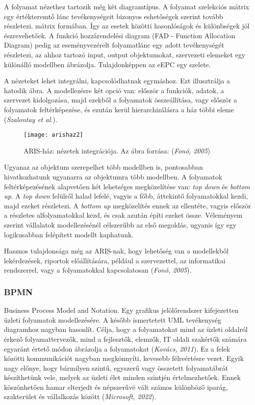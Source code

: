 \documentclass[12pt]{article}
\begin{document}
A folyamat nézethez tartozik még két diagramtípus. A folyamat szelekciós mátrix egy értékteremtő lánc tevékenységeit bizonyos eshetőségek szerint tovább részletezi, mátrix formában. Így az esetek közötti hasonlóságok és különbségek jól észrevehetőek. A funkció hozzárendelési diagram (FAD -  Function Allocation Diagram) pedig az eseményvezérelt folyamatlánc egy adott tevékenységét részletezi, az ahhoz tartozó input, output objektumokat, szervezeti elemeket egy különálló modellben ábrázolja. Tulajdonképpen az eEPC egy szelete.

A nézeteket lehet integrálni, kapcsolódhatnak egymáshoz. Ezt illusztrálja a hatodik ábra. A modellezésre két opció van: először a funkciók, adatok, a szervezet kidolgozása, majd ezekből a folyamatok összeállítása, vagy először a folyamatok feltérképezése, és ezután kerül hierarchizálásra a ház többi eleme (\textit{Szalontay et al.}).

\begin{figure}
\centering
\texttt{[image: arishaz2]}
\caption{ARIS-ház: nézetek integrációja. Az ábra forrása:  (\textit{Fonó, 2005})}
\end{figure}

Ugyanaz az objektum szerepelhet több modellben is, pontosabban hivatkozhatunk ugyanarra az objektumra több modellben. A folyamatok feltérképezésének alapvetően két lehetséges megközelítése van: \textit{ top down} és \textit{bottom up}. A \textit{top down} felülről halad lefelé, vagyis a főbb, áttekintő folyamatokkal kezdi, majd ezeket részletezi. A \textit{bottom up} megközelítés ennek az ellentéte, vagyis először a részletes alfolyamatokkal kezd, és csak azután építi ezeket össze. Véleményem szerint vállalatok modellezésénél célszerűbb az első megoldás, ugyanis így egy logikusabban felépített modellt kaphatunk.

Hasznos tulajdonsága még az ARIS-nak, hogy lehetőség van a modellekből lekérdezések, riportok előállítására, például a szervezettel, az informatikai rendszerrel, vagy a folyamatokkal kapcsolatosan (\textit{Fonó, 2005}).

\subsubsection{BPMN}

Business Process Model and Notation. Egy grafikus jelölőrendszer kifejezetten üzleti folyamatok modellezésére. A később ismertetett UML tevékenység diagramhoz nagyban hasonlít. Célja, hogy a folyamatokat mind az üzleti oldalról érkező folyamattervezők, mind a fejlesztők, elemzők, IT oldali szakértők számára egyaránt értető módon ábrázolja a folyamatokat (\textit{Kovács, 2011}). Ez a felek közötti kommunikációt nagyban megkönnyíti, kevesebb félreértésre vezet. Egyik nagy előnye, hogy bármilyen szintű, egyszerű vagy összetett folyamatábrát készíthetünk vele, melyek az üzleti élet minden szintjén értelmezhetőek.  Ennek köszönhetően hamar elterjedt és népszerűvé vált számos különböző iparág, szakterület és vállalkozás között  (\textit{Microsoft, 2022}).
\end{document}
